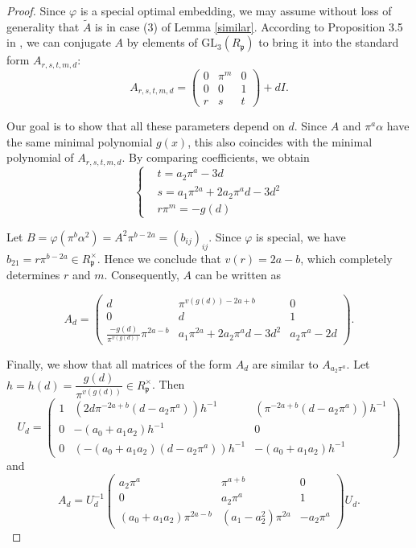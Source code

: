 \documentclass[12pt]{article}
\theoremstyle{plain}
\theoremstyle{definition}
\theoremstyle{remark}
\begin{document}
\begin{proof}
Since $\varphi$ is a special optimal embedding, we may assume without loss of generality that $\widetilde{A}$ is in case (3) of Lemma \ref{similar}. According to Proposition 3.5 in \cite{Avni29072009}, we can conjugate $A$ by elements of $\mathrm{GL}_3(R_\mathfrak{p})$ to bring it into the standard form $A_{r,s,t,m,d}$:
$$
A_{r,s,t,m,d}=\begin{pmatrix} 0 & \pi^m  & 0 \\ 0 & 0 & 1 \\ r & s & t \end{pmatrix}+dI.
$$

Our goal is to show that all these parameters depend on $d$. Since $A$ and $\pi^a\alpha$ have the same minimal polynomial $g(x)$, this also coincides with the minimal polynomial of $A_{r,s,t,m,d}$. By comparing coefficients, we obtain
$$
\left\{
\begin{aligned}
&t=a_2\pi^a-3d \\
&s=a_1\pi^{2a}+2a_2\pi^ad-3d^2 \\
&r\pi^m=-g(d)
\end{aligned}
\right.
$$

Let $B = \varphi(\pi^b\alpha^2) = A^2\pi^{b-2a} = (b_{ij})_{ij}$. Since $\varphi$ is special, we have $b_{21}=r\pi^{b-2a}\in R_\mathfrak{p}^\times$. Hence we conclude that $v(r) = 2a-b$, which completely determines $r$ and $m$.
Consequently, $A$ can be written as

$$
A_d=\begin{pmatrix}
d & \pi^{v(g(d))-2a+b} & 0 \\
0 & d & 1 \\
\frac{-g(d)}{\pi^{v(g(d))}}\pi^{2a-b} & a_1\pi^{2a}+2a_2\pi^ad-3d^2 & a_2\pi^a-2d
\end{pmatrix}.
$$

Finally, we show that all matrices of the form $A_d$ are similar to $A_{a_2\pi^a}$. Let $h=h(d) = \dfrac{g(d)}{\pi^{v(g(d))}}\in R_\mathfrak{p}^\times$. Then
$$
U_d=\begin{pmatrix}
1 & (2 d \pi^{-2a+b} (d - a_2 \pi^{a}))h^{-1} & (\pi^{-2a+b} (d - a_2 \pi^{a}))h^{-1} \\
0 & -(a_0 + a_1 a_2)h^{-1} & 0 \\
0 & (-(a_0 + a_1 a_2)(d - a_2 \pi^{a}))h^{-1} & -(a_0 + a_1 a_2)h^{-1}
\end{pmatrix}
$$
and
$$
A_d=U_d^{-1}\begin{pmatrix}
a_2 \pi^{a} & \pi^{a+b} & 0 \\
0 & a_2 \pi^{a} & 1 \\
(a_0 + a_1 a_2)\pi^{2a-b} & (a_1 - a_2^2)\pi^{2a} & -a_2 \pi^{a}
\end{pmatrix}U_d.
$$


\end{proof}
\end{document}
